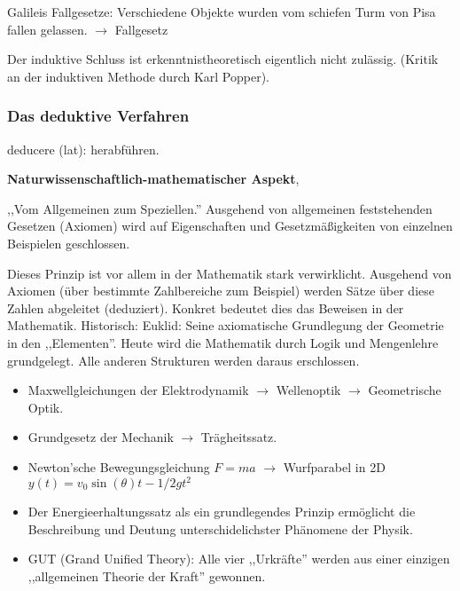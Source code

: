 
\begin{beisp}
	Galileis Fallgesetze: Verschiedene Objekte wurden vom schiefen Turm von Pisa fallen gelassen. $\longrightarrow$ Fallgesetz
\end{beisp}

\bip
Der induktive Schluss ist erkenntnistheoretisch eigentlich
nicht zul\"{a}ssig. (Kritik an der induktiven Methode durch Karl Popper).

\subsubsection{Das deduktive Verfahren}

deducere (lat): herabf\"{u}hren.

\mip
{\bf Naturwissenschaftlich-mathematischer Aspekt},

,,Vom Allgemeinen zum Speziellen.''
Ausgehend von allgemeinen feststehenden Gesetzen (Axiomen)
wird auf Eigenschaften und Gesetzm\"{a}{\ss}igkeiten von einzelnen
Beispielen geschlossen.

\bip
Dieses Prinzip ist vor allem in der Mathematik stark verwirklicht.
Ausgehend von Axiomen (\"{u}ber bestimmte Zahlbereiche zum Beispiel)
werden S\"{a}tze \"{u}ber diese Zahlen abgeleitet (deduziert).
Konkret bedeutet dies das Beweisen in der Mathematik.
\mip
Historisch: Euklid: Seine axiomatische Grundlegung der Geometrie in den
,,Elementen''.
\mip
Heute wird die Mathematik durch Logik und Mengenlehre grundgelegt.
Alle anderen Strukturen werden daraus erschlossen.

\begin{beisp2}
	\begin{itemize}
\item Maxwellgleichungen der Elektrodynamik
             $\longrightarrow$ Wellenoptik $\longrightarrow$ Geometrische Optik.
\item Grundgesetz der Mechanik $\longrightarrow$ Tr\"{a}gheitssatz.
\item Newton'sche Bewegungsgleichung $F=ma$ $\longrightarrow$ Wurfparabel in 2D $y(t) = v_0 \sin(\theta)t - 1/2 gt^2$ 
\item Der Energieerhaltungssatz als ein grundlegendes Prinzip erm\"{o}glicht
die Beschreibung und Deutung unterschidelichster Ph\"{a}nomene der Physik.
\item GUT (Grand Unified Theory):
Alle vier ,,Urkr\"{a}fte'' werden aus einer
einzigen ,,allgemeinen Theorie der Kraft'' gewonnen.
\end{itemize}
\end{beisp2}



